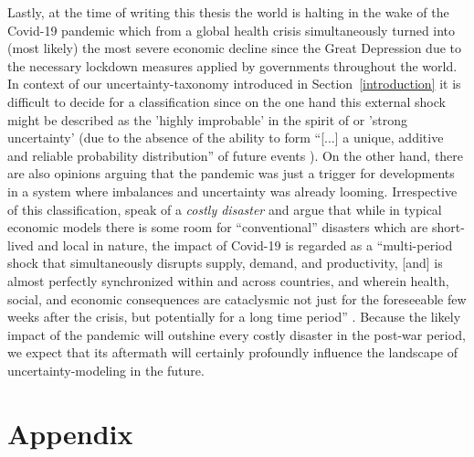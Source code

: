 \documentclass[a4paper,11pt,listof=nochaptergap,oneside,pointednumbers,bibtotoc,bigheadings,liststotoc,hidelinks]{scrbook}
\theoremstyle{mysatz}
\theoremstyle{mydefinition}
\theoremstyle{mytheorem}
\theoremstyle{mybemerkung}
\begin{document}
Lastly, at the time of writing this thesis the world is halting in the wake of the Covid-19 pandemic which from a global health crisis simultaneously turned into (most likely) the most severe economic decline since the Great Depression due to the necessary lockdown measures applied by governments throughout the world. In context of our uncertainty-taxonomy introduced in Section~\ref{introduction} it is difficult to decide for a classification since on the one hand this external shock might be described as the 'highly improbable' in the spirit of \citet{taleb:08} or 'strong uncertainty' (due to the absence of the ability to form ``[...] a unique, additive and reliable probability distribution'' of future events \citep[p. 622/623]{dequech:14}). On the other hand, there are also opinions arguing that the pandemic was just a trigger for developments in a system where imbalances and uncertainty was already looming. Irrespective of this classification, \citet{ludvigsonetal:20} speak of a \textit{costly disaster} and argue that while in typical economic models there is some room for ``conventional'' disasters \citep[p. 2]{ludvigsonetal:20} which are short-lived and local in nature, the impact of Covid-19 is regarded as a ``multi-period shock that simultaneously disrupts supply, demand, and productivity, [and] is almost perfectly synchronized within and across countries, and wherein health, social, and economic consequences are cataclysmic not just for the foreseeable few weeks after the crisis, but potentially for a long time period'' \citet[p. 2]{ludvigsonetal:20}. Because the likely impact of the pandemic will outshine every costly disaster in the post-war period, we expect that its aftermath will certainly profoundly influence the landscape of uncertainty-modeling in the future.



\newpage
\appendix


\chapter{Appendix}
\label{VARAndLocalProjection}
\end{document}
